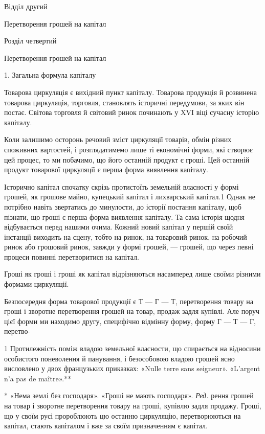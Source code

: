 Відділ другий

Перетворення грошей на капітал

Розділ четвертий

Перетворення грошей на капітал

1. Загальна формула капіталу

Товарова циркуляція є вихідний пункт капіталу. Товарова
продукція й розвинена товарова циркуляція, торговля, становлять
історичні передумови, за яких він постає. Світова торговля
й світовий ринок починають у XVI віці сучасну історію
капіталу.

Коли залишимо осторонь речовий зміст циркуляції товарів,
обмін різних споживних вартостей, і розглядатимемо лише ті
економічні форми, які створює цей процес, то ми побачимо,
що його останній продукт є гроші. Цей останній продукт товарової
циркуляції є перша форма виявлення капіталу.

Історично капітал спочатку скрізь протистоїть земельній
власності у формі грошей, як грошове майно, купецький капітал
і лихварський капітал.1 Однак не потрібно навіть звертатись до
минулости, до історії постання капіталу, щоб пізнати, що гроші
є перша форма виявлення капіталу. Та сама історія щодня відбувається
перед нашими очима. Кожний новий капітал у першій
своїй інстанції виходить на сцену, тобто на ринок, на товаровий
ринок, на робочий ринок або грошовий ринок, завжди у формі
грошей, — грошей, що через певні процеси повинні перетворитися
на капітал.

Гроші як гроші і гроші як капітал відрізняються насамперед
лише своїми різними формами циркуляції.

Безпосередня форма товарової продукції є Т — Г — Т, перетворення
товару на гроші і зворотне перетворення грошей на
товар, продаж задля купівлі. Але поруч цієї форми ми находимо
другу, специфічно відмінну форму, форму Г — Т — Г, перетво-

1    Протилежність поміж владою земельної власности, що спирається
на відносини особистого поневолення й панування, і безособовою владою
грошей ясно висловлено у двох французьких приказках: «Nulle terre
sans seigneur». «L’argent n’a pas de maître».**

* «Нема землі без господаря». «Гроші не мають господаря». \emph{Ред.}
рення грошей на товар і зворотне перетворення товару на гроші,
купівлю задля продажу. Гроші, що у своїм русі пророблюють
цю останню циркуляцію, перетворюються на капітал, стають
капіталом і вже за своїм призначенням є капітал.

